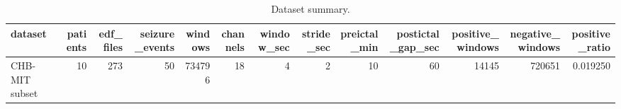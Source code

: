 \begin{table}
\caption{Dataset summary.}
\label{tab:dataset_summary}
\begin{tabular}{lrrrrrrrrrrrr}
\toprule
dataset & patients & edf\_files & seizure\_events & windows & channels & window\_sec & stride\_sec & preictal\_min & postictal\_gap\_sec & positive\_windows & negative\_windows & positive\_ratio \\
\midrule
CHB-MIT subset & 10 & 273 & 50 & 734796 & 18 & 4 & 2 & 10 & 60 & 14145 & 720651 & 0.019250 \\
\bottomrule
\end{tabular}
\end{table}
